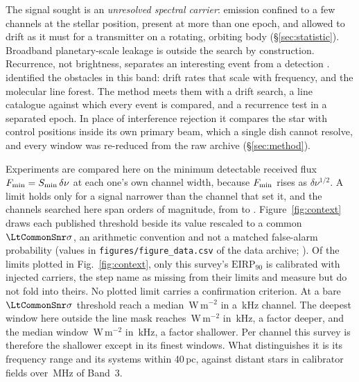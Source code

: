 The signal sought is an \emph{unresolved spectral carrier}: emission confined
to a few channels at the stellar position, present at more than one epoch, and
allowed to drift as it must for a transmitter on a rotating, orbiting body
(\S\ref{sec:statistic}). Broadband planetary-scale leakage \citep{BRaTs2026} is
outside the search by construction. Recurrence, not brightness, separates an
interesting event from a detection \citep{Sheikh2021}. \citet{Mason2025}
identified the obstacles in this band: drift rates that scale with frequency,
and the molecular line forest. The method meets them with a drift search, a
line catalogue against which every event is compared, and a recurrence test in
a separated epoch. In place of interference rejection it compares the star
with control positions inside its own primary beam, which a single dish cannot
resolve, and every window was re-reduced from the raw archive
(\S\ref{sec:method}).

Experiments are compared here on the minimum detectable received flux
$F_{\rm min}=S_{\rm min}\,\delta\nu$ at each one's own channel width, because
$F_{\rm min}$ rises as $\delta\nu^{1/2}$. A limit holds only for a signal
narrower than the channel that set it, and the channels searched here span
\LtChanSpanDex{} orders of magnitude, from \LtChanNarrow{} to \LtChanWide.
Figure~\ref{fig:context} draws each published threshold beside its value
rescaled to a common $\LtCommonSnr\sigma$, an arithmetic convention and not a
matched false-alarm probability (values in \texttt{figures/figure\_data.csv}
of the data archive; \citealt{SIdeposit}). Of the limits plotted in
Fig.~\ref{fig:context}, only this survey's $\mathrm{EIRP}_{90}$ is calibrated with injected carriers, the step
\citet{Price2020} name as missing from their limits and \citet{Margot2023}
measure but do not fold into theirs. No plotted limit carries a confirmation
criterion. At a bare $\LtCommonSnr\sigma$ threshold \citet{Mason2025} reach a
median \MasonFluxMed\,W\,m$^{-2}$ in a \MasonChanKHz\,kHz channel. The deepest
window here outside the line mask reaches \FluxTrigBest\,W\,m$^{-2}$ in
\FluxChanBestKHz\,kHz, a factor \FluxNatBestRatio{} deeper, and the median
window \FluxTrigMed\,W\,m$^{-2}$ in \FluxChanMedKHz\,kHz, a factor
\FluxNatMedRatio{} shallower. Per channel this survey is therefore the
shallower except in its finest windows. What distinguishes it is its frequency
range and its \NSysClassA{} systems within 40\,pc, against distant stars in
\MasonNCal{} calibrator fields over \MasonBandMHz\,MHz of Band~3.
